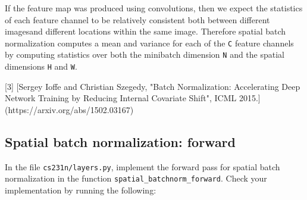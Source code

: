 \documentclass[11pt]{article}
\begin{document}
If the feature map was produced using convolutions, then we expect the
statistics of each feature channel to be relatively consistent both
between different imagesand different locations within the same image.
Therefore spatial batch normalization computes a mean and variance for
each of the \texttt{C} feature channels by computing statistics over
both the minibatch dimension \texttt{N} and the spatial dimensions
\texttt{H} and \texttt{W}.

{[}3{]} {[}Sergey Ioffe and Christian Szegedy, "Batch Normalization:
Accelerating Deep Network Training by Reducing Internal Covariate
Shift", ICML 2015.{]}(https://arxiv.org/abs/1502.03167)

    \subsection{Spatial batch normalization:
forward}\label{spatial-batch-normalization-forward}

In the file \texttt{cs231n/layers.py}, implement the forward pass for
spatial batch normalization in the function
\texttt{spatial\_batchnorm\_forward}. Check your implementation by
running the following:
\end{document}
